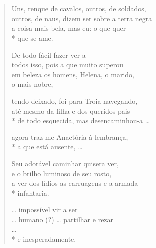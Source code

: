 \section*{}
\section*{}

\begin{verse}
Uns, renque de cavalos, outros, de soldados,\\
outros, de naus, dizem ser sobre a terra negra\\
a coisa mais bela, mas eu: o que quer\\*
que se ame.

De todo fácil fazer ver a\\
todos isso, pois a que muito superou\\			
em beleza os homens, Helena, o marido, \\
o mais nobre,

tendo deixado, foi para Troia navegando,\\
até mesmo da filha e dos queridos pais\\*
de todo esquecida, mas desencaminhou-a \ldots{}

agora traz-me Anactória à lembrança,\\*
a que está ausente, \ldots{}

Seu adorável caminhar quisera ver,\\
e o brilho luminoso de seu rosto,\\
a ver dos lídios as carruagens e a armada\\*
infantaria.

\ldots{} impossível vir a ser\\
\ldots{} humano (?) \ldots{} partilhar e rezar\\
\ldots{}\\*
e inesperadamente.
\end{verse}

\pagebreak

